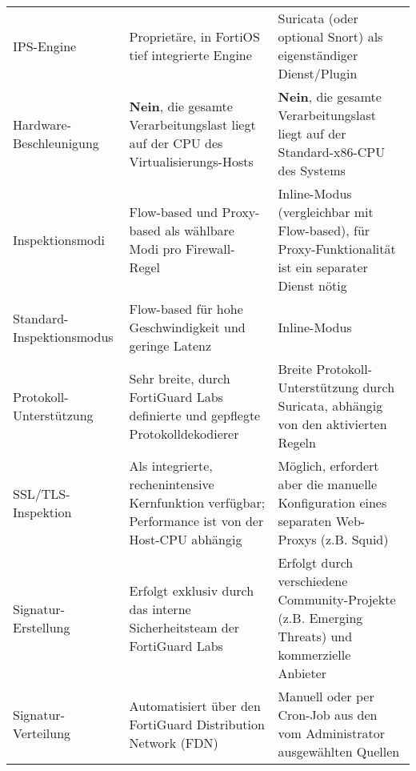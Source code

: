 \begin{longtable}{>{\RaggedRight}p{} >{\RaggedRight}p{} >{\RaggedRight}p{}}
	\multicolumn{3}{l}{\textbf{II. Technische Implementierung des IPS}} \\
	\midrule
	IPS-Engine & Proprietäre, in FortiOS tief integrierte Engine & Suricata (oder optional Snort) als eigenständiger Dienst/Plugin \\
	\addlinespace
	Hardware-Beschleunigung & \textbf{Nein}, die gesamte Verarbeitungslast liegt auf der CPU des Virtualisierungs-Hosts & \textbf{Nein}, die gesamte Verarbeitungslast liegt auf der Standard-x86-CPU des Systems \\
	\addlinespace
	Inspektionsmodi & Flow-based und Proxy-based als wählbare Modi pro Firewall-Regel & Inline-Modus (vergleichbar mit Flow-based), für Proxy-Funktionalität ist ein separater Dienst nötig \\
	\addlinespace
	Standard-Inspektionsmodus & Flow-based für hohe Geschwindigkeit und geringe Latenz & Inline-Modus \\
	\addlinespace
	Protokoll-Unterstützung & Sehr breite, durch FortiGuard Labs definierte und gepflegte Protokolldekodierer & Breite Protokoll-Unterstützung durch Suricata, abhängig von den aktivierten Regeln \\
	\addlinespace
	SSL/TLS-Inspektion & Als integrierte, rechenintensive Kernfunktion verfügbar; Performance ist von der Host-CPU abhängig & Möglich, erfordert aber die manuelle Konfiguration eines separaten Web-Proxys (z.B. Squid) \\
	\addlinespace
	Signatur-Erstellung & Erfolgt exklusiv durch das interne Sicherheitsteam der FortiGuard Labs & Erfolgt durch verschiedene Community-Projekte (z.B. Emerging Threats) und kommerzielle Anbieter \\
	\addlinespace
	Signatur-Verteilung & Automatisiert über den FortiGuard Distribution Network (FDN) & Manuell oder per Cron-Job aus den vom Administrator ausgewählten Quellen \\
	\midrule
	

\end{longtable}

